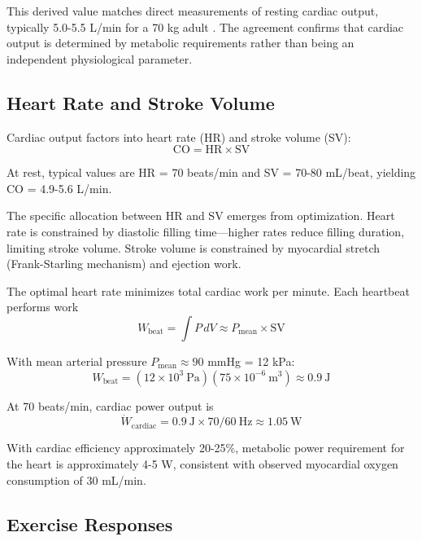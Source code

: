 \documentclass[12pt,a4paper]{article}
\theoremstyle{remark}
\begin{document}
This derived value matches direct measurements of resting cardiac output, typically 5.0-5.5 L/min for a 70 kg adult \cite{holt1968hemodynamic}. The agreement confirms that cardiac output is determined by metabolic requirements rather than being an independent physiological parameter.

\subsection{Heart Rate and Stroke Volume}

Cardiac output factors into heart rate (HR) and stroke volume (SV):
\begin{equation}
\mathrm{CO} = \mathrm{HR} \times \mathrm{SV}
\end{equation}

At rest, typical values are HR = 70 beats/min and SV = 70-80 mL/beat, yielding CO = 4.9-5.6 L/min.

The specific allocation between HR and SV emerges from optimization. Heart rate is constrained by diastolic filling time—higher rates reduce filling duration, limiting stroke volume. Stroke volume is constrained by myocardial stretch (Frank-Starling mechanism) and ejection work.

The optimal heart rate minimizes total cardiac work per minute. Each heartbeat performs work
\begin{equation}
W_{\mathrm{beat}} = \int P \, dV \approx P_{\mathrm{mean}} \times \mathrm{SV}
\end{equation}

With mean arterial pressure $P_{\mathrm{mean}} \approx 90$ mmHg = 12 kPa:
\begin{equation}
W_{\mathrm{beat}} = (12 \times 10^{3}~\mathrm{Pa})(75 \times 10^{-6}~\mathrm{m}^{3}) \approx 0.9~\mathrm{J}
\end{equation}

At 70 beats/min, cardiac power output is
\begin{equation}
\dot{W}_{\mathrm{cardiac}} = 0.9~\mathrm{J} \times 70/60~\mathrm{Hz} \approx 1.05~\mathrm{W}
\end{equation}

With cardiac efficiency approximately 20-25\%, metabolic power requirement for the heart is approximately 4-5 W, consistent with observed myocardial oxygen consumption of 30 mL/min.

\subsection{Exercise Responses}
\end{document}
